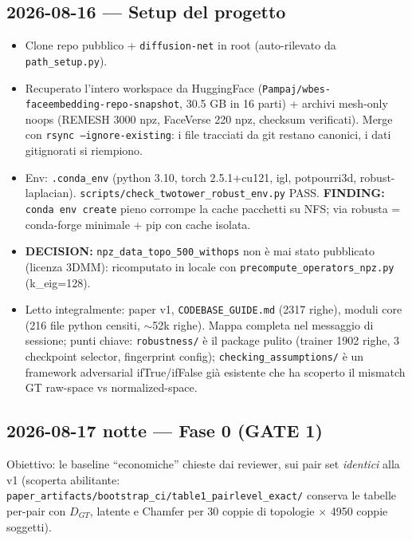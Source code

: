 \documentclass[11pt,a4paper]{article}
\newcommand{\finding}[1]{\textcolor{finding}{\textbf{FINDING:}} #1}
\newcommand{\decision}[1]{\textcolor{decision}{\textbf{DECISION:}} #1}
\begin{document}
\subsection{2026-08-16 --- Setup del progetto}
\begin{itemize}
\item Clone repo pubblico + \texttt{diffusion-net} in root (auto-rilevato da \texttt{path\_setup.py}).
\item Recuperato l'intero workspace da HuggingFace (\texttt{Pampaj/wbes-faceembedding-repo-snapshot},
      30.5 GB in 16 parti) + archivi mesh-only noops (REMESH 3000 npz, FaceVerse 220 npz,
      checksum verificati). Merge con \texttt{rsync --ignore-existing}: i file tracciati da git
      restano canonici, i dati gitignorati si riempiono.
\item Env: \texttt{.conda\_env} (python 3.10, torch 2.5.1+cu121, igl, potpourri3d,
      robust-laplacian). \texttt{scripts/check\_twotower\_robust\_env.py} PASS.
      \finding{\texttt{conda env create} pieno corrompe la cache pacchetti su NFS; via
      robusta = conda-forge minimale + pip con cache isolata.}
\item \decision{\texttt{npz\_data\_topo\_500\_withops} non \`e mai stato pubblicato (licenza 3DMM):
      ricomputato in locale con \texttt{precompute\_operators\_npz.py} (k\_eig=128).}
\item Letto integralmente: paper v1, \texttt{CODEBASE\_GUIDE.md} (2317 righe), moduli core
      (216 file python censiti, $\sim$52k righe). Mappa completa nel messaggio di sessione;
      punti chiave: \texttt{robustness/} \`e il package pulito (trainer 1902 righe, 3 checkpoint
      selector, fingerprint config); \texttt{checking\_assumptions/} \`e un framework adversarial
      ifTrue/ifFalse gi\`a esistente che ha scoperto il mismatch GT raw-space vs normalized-space.
\end{itemize}

\subsection{2026-08-17 notte --- Fase 0 (GATE 1)}

Obiettivo: le baseline ``economiche'' chieste dai reviewer, sui pair set \emph{identici}
alla v1 (scoperta abilitante: \texttt{paper\_artifacts/bootstrap\_ci/table1\_pairlevel\_exact/}
conserva le tabelle per-pair con $D_{GT}$, latente e Chamfer per 30 coppie di topologie
$\times$ 4950 coppie soggetti).
\end{document}
